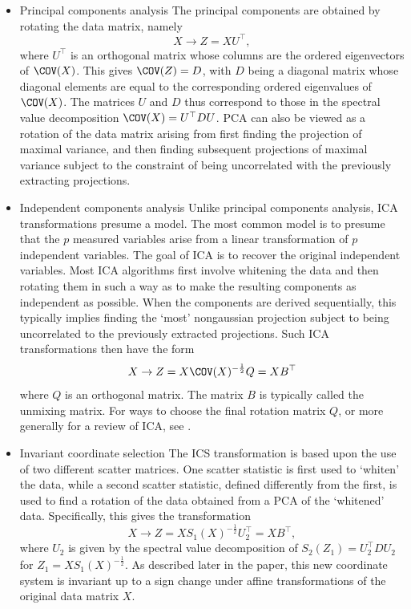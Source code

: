 \documentclass[article,nojss]{jss}
\begin{document}
\begin{itemize}
\item Principal components analysis \newline
 The principal components  are obtained by rotating the data matrix, namely
  \[
  X \rightarrow Z= XU^\top ,
  \]
 where $U^\top $ is an orthogonal matrix whose columns are the ordered eigenvectors of $\COV(X)$.
 This gives $\COV(Z) = D$, with $D$ being a diagonal matrix whose diagonal elements are
 equal to the corresponding ordered eigenvalues of $\COV(X)$. The matrices $U$ and $D$ thus
 correspond to those in the spectral value decomposition $\COV(X)=U^\top DU$. {PCA} can also be
 viewed as a rotation of the data matrix arising from first finding the projection of maximal
 variance, and then finding subsequent projections of maximal variance subject to the constraint
 of being uncorrelated with the previously extracting projections.
\item Independent components analysis\newline
 Unlike principal components analysis, {ICA} transformations presume a model. The most common
 model is to presume that the $p$ measured variables arise from a linear transformation of $p$
 independent variables.  The goal of {ICA} is to recover the original independent variables.
 Most {ICA} algorithms first involve whitening the data and then rotating them in such a way as
 to make the resulting components as independent as possible. When the components are derived sequentially,
 this typically implies finding the `most' nongaussian projection subject to being uncorrelated
 to the previously extracted projections. Such {ICA} transformations then have the form
\[
  X \rightarrow Z= X\COV(X)^{-\frac{1}{2}}Q = XB^\top
\]
 where $Q$ is an orthogonal matrix.  The matrix $B$ is typically called the unmixing matrix.  For ways to choose
 the final rotation matrix $Q$, or more generally for a review of {ICA}, see \citet{HyvarinenKarhunenOja2001}.
\item Invariant coordinate selection \newline
 The {ICS} transformation is based upon the use of two different scatter matrices. One
 scatter statistic is first used to `whiten' the data, while a second scatter statistic, defined differently
 from the first, is used to find a rotation of the data obtained from a {PCA} of the `whitened' data. Specifically,
 this gives the transformation
  \[
  X \rightarrow Z= X S_1(X)^{-\frac{1}{2}}U_2^\top = XB^\top,
  \]
 where $U_2$ is given by the spectral value decomposition of $S_2(Z_1)=U_2^\top DU_2$ for $Z_1 =X S_1(X)^{-\frac{1}{2}}$.
 As described later in the paper, this new coordinate system is invariant up to a sign change under
 affine transformations of the original data matrix $X$.
\end{itemize}
\end{document}
